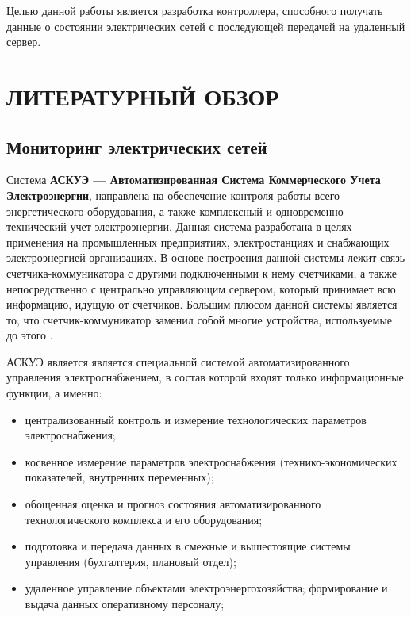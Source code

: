 \documentclass[utf8,14pt, coursreport]{G7-32}
\begin{document}
Целью данной работы является разработка контроллера, способного получать данные о состоянии электрических сетей с последующей передачей на удаленный сервер.

\mainmatter %


\chapter{ЛИТЕРАТУРНЫЙ ОБЗОР}

\section{Мониторинг электрических сетей}

Система \textbf{АСКУЭ --- Автоматизированная Система Коммерческого Учета Электроэнергии}, направлена на обеспечение контроля работы всего энергетического оборудования, а также комплексный и одновременно технический учет электроэнергии. Данная система разработана в целях применения на промышленных предприятиях, электростанциях и снабжающих электроэнергией организациях. В основе построения данной системы лежит связь счетчика-коммуникатора с другими подключенными к нему счетчиками, а также непосредственно с центрально управляющим сервером, который принимает всю информацию, идущую от счетчиков. Большим плюсом данной системы является то, что счетчик-коммуникатор заменил собой многие устройства, используемые до этого \cite{ascaepinfo}.

АСКУЭ является является специальной системой автоматизированного управления электроснабжением, в состав которой входят только информационные функции, а именно:
\begin{itemize}
\item централизованный контроль и измерение технологических параметров электроснабжения;
\item косвенное измерение параметров электроснабжения (технико-экономических показателей, внутренних переменных);
\item обощенная оценка и прогноз состояния автоматизированного технологического комплекса и его оборудования;
\item подготовка и передача данных в смежные и вышестоящие системы управления (бухгалтерия, плановый отдел);
\item удаленное управление объектами электроэнергохозяйства; формирование и выдача
данных оперативному персоналу;
\end{itemize}
\end{document}
